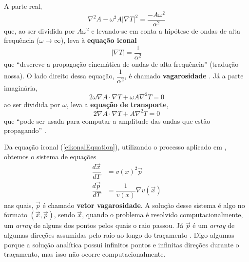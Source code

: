                 A parte real,
                \begin{equation}
                    \nabla^2A - \omega^2A|\nabla T|^2 = \dfrac{-A\omega^2}{\alpha^2}
                \end{equation}
                que, ao ser dividida por $A\omega^2$ e levando-se em conta a hipótese de ondas de alta frequência ($\omega \rightarrow \infty$), leva à \textbf{equação iconal}
                \begin{equation}
                    \label{eikonalEquation}
                    |\nabla T| = \dfrac{1}{\alpha^2}
                \end{equation}
                que ``descreve a propagação cinemática de ondas de alta frequência'' \cite{RawlinsonSlide06_RayTheory} (tradução nossa). O lado direito dessa equação, $\dfrac{1}{\alpha^2}$, é chamado \textbf{vagarosidade} \cite{RawlinsonSlide06_RayTheory}. Já a parte imaginária,
                \begin{equation}
                    2\omega\nabla A\cdot\nabla T + \omega A\nabla^2T = 0
                \end{equation}
                ao ser dividida por $\omega$, leva a \textbf{equação de transporte},
                \begin{equation}
                    2\nabla A\cdot\nabla T + A\nabla^2T = 0
                \end{equation}
                que ``pode ser usada para computar a amplitude das ondas que estão propagando'' \cite{RawlinsonSlide06_RayTheory}.
                
                Da equação iconal (\ref{eikonalEquation}), utilizando o processo aplicado em \cite{Miqueles2006}, obtemos o sistema de equações 
                \begin{align}
                    \dfrac{d\vec{x}}{dT} &= v(x)^2\vec{p}\\
                    \dfrac{d\vec{p}}{dT} &= \dfrac{1}{v(x)}\nabla v(\vec{x})
                \end{align}
                nas quais, $\vec{p}$ é chamado \textbf{vetor vagarosidade}. A solução desse sistema é algo no formato $(\vec{x}, \vec{p})$, sendo $\vec{x}$, quando o problema é resolvido computacionalmente, um \textit{array} de alguns dos pontos pelos quais o raio passou. Já $\vec{p}$ é um \textit{array} de algumas direções assumidas pelo raio ao longo do traçamento \cite{Miqueles2006}. Digo algumas porque a solução analítica possui infinitos pontos e infinitas direções durante o traçamento, mas isso não ocorre computacionalmente.